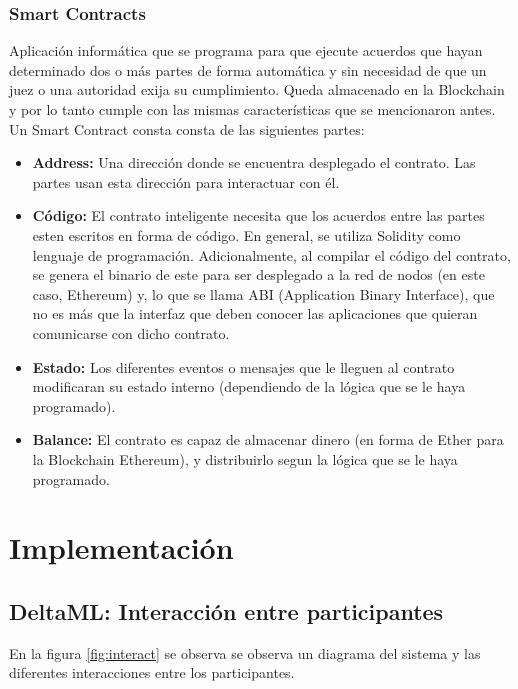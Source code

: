 \documentclass[
11pt, %
oneside, %
spanish, %
singlespacing, %
parskip, %
headsepline, %
chapterinoneline, %
]{MastersDoctoralThesis} %
\begin{document}
\subsection{Smart Contracts \cite{sc}}
Aplicación informática que se programa para que ejecute acuerdos que hayan determinado dos o más partes de forma automática y sin necesidad de que un juez o una autoridad exija su cumplimiento.
Queda almacenado en la Blockchain y por lo tanto cumple con las mismas características que se mencionaron antes.
Un Smart Contract consta consta de las siguientes partes:

\begin{itemize}
\item \textbf{Address:} Una dirección donde se encuentra desplegado el contrato. Las partes usan esta dirección para interactuar con él.
\item \textbf{Código:} El contrato inteligente necesita que los acuerdos entre las partes esten escritos en forma de código. En general, se utiliza Solidity como lenguaje de programación. Adicionalmente, al compilar el código del contrato, se genera el binario de este para ser desplegado a la red de nodos (en este caso, Ethereum) y, lo que se llama ABI (Application Binary Interface), que no es más que la interfaz que deben conocer las aplicaciones que quieran comunicarse con dicho contrato.
\item \textbf{Estado:} Los diferentes eventos o mensajes que le lleguen al contrato modificaran su estado interno (dependiendo de la lógica que se le haya programado).
\item  \textbf{Balance:} El contrato es capaz de almacenar dinero (en forma de Ether para la Blockchain Ethereum), y distribuirlo segun la lógica que se le haya programado.
\end{itemize}


\newpage

\chapter{Implementación}

\section{DeltaML: Interacción entre participantes}
En la figura \ref{fig:interact} se observa se observa un diagrama del sistema y las diferentes interacciones entre los participantes.
\end{document}

